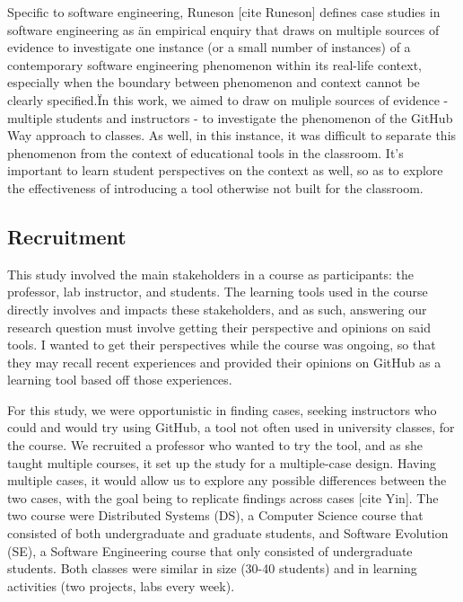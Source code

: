 Specific to software engineering, Runeson [cite Runeson] defines case studies in software engineering as \"an empirical enquiry that draws on multiple sources of evidence to investigate one instance (or a small number of instances) of a contemporary software engineering phenomenon within its real-life context, especially when the boundary between phenomenon and context cannot be clearly specified.\" In this work, we aimed to draw on muliple sources of evidence - multiple students and instructors - to investigate the phenomenon of the GitHub Way approach to classes. As well, in this instance, it was difficult to separate this phenomenon from the context of educational tools in the classroom. It's important to learn student perspectives on the context as well, so as to explore the effectiveness of introducing a tool otherwise not built for the classroom.

\subsection{Recruitment}
This study involved the main stakeholders in a course as participants: the professor, lab instructor, and students. The learning tools used in the course directly involves and impacts these stakeholders, and as such, answering our research question must involve getting their perspective and opinions on said tools. I wanted to get their perspectives while the course was ongoing, so that they may recall recent experiences and provided their opinions on GitHub as a learning tool based off those experiences.


For this study, we were opportunistic in finding cases, seeking instructors who could and would try using GitHub, a tool not often used in university classes, for the course. We recruited a professor who wanted to try the tool, and as she taught multiple courses, it set up the study for a multiple-case design. Having multiple cases, it would allow us to explore any possible differences between the two cases, with the goal being to replicate findings across cases [cite Yin]. The two course were Distributed Systems (DS), a Computer Science course that consisted of both undergraduate and graduate students, and Software Evolution (SE), a Software Engineering course that only consisted of undergraduate students. Both classes were similar in size (30-40 students) and in learning activities (two projects, labs every week).

